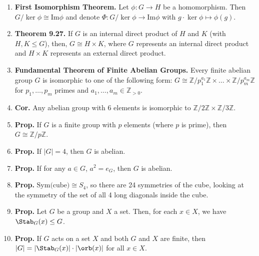 \begin{enumerate}
	\item \textbf{First Isomorphism Theorem. } Let $\phi: G \to H$ be a homomorphism. Then $G/\ker\phi \cong \textrm{Im}\phi$ and denote $\Phi: G/\ker\phi \to \textrm{Im}\phi$ with $g \cdot \ker\phi \mapsto \phi(g)$. 
	\item \textbf{Theorem 9.27. } If $G$ is an internal direct product of $H$ and $K$ (with $H,K \leq G$), then, $G \cong H \times K$, where $G$ represents an internal direct product and $H \times K$ represents an external direct product. 
	\item \textbf{Fundamental Theorem of Finite Abelian Groups. } Every finite abelian group $G$ is isomorphic to one of the following form: $G \cong \mathbb{Z}/p_1^{a_1}\mathbb{Z} \times \dots \times \mathbb{Z}/p_m^{a_m}\mathbb{Z}$ for $p_1,\dots,p_m$ primes and $a_1,\dots,a_m \in \mathbb{Z}_{>0}$. 
	\item \textbf{Cor. } Any abelian group with 6 elements is isomorphic to $\mathbb{Z}/2\mathbb{Z} \times \mathbb{Z}/3\mathbb{Z}$. 
	\item \textbf{Prop. } If $G$ is a finite group with $p$ elements (where $p$ is prime), then $G \cong \mathbb{Z}/p\mathbb{Z}$. 
	\item \textbf{Prop. } If $|G| = 4$, then $G$ is abelian. 
	\item \textbf{Prop. } If for any $a \in G$, $a^2 = e_G$, then $G$ is abelian. 
	\item \textbf{Prop. } $\textrm{Sym(cube)} \cong S_4$, so there are 24 symmetries of the cube, looking at the symmetry of the set of all 4 long diagonals inside the cube. 
	\item \textbf{Prop. } Let $G$ be a group and $X$ a set. Then, for each $x \in X$, we have $\Stab_G(x) \leq G$. 
	\item \textbf{Prop. } If $G$ acts on a set $X$ and both $G$ and $X$ are finite, then $|G|=|\Stab_G(x)| \cdot |\orb(x)|$ for all $x \in X$. 
\end{enumerate}


